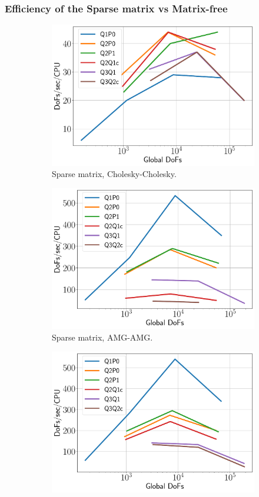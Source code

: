 \documentclass{beamer}
\begin{document}
\begin{frame}
	\frametitle{Efficiency of the Sparse matrix vs Matrix-free}
	\begin{figure}[H]
		\begin{subfigure}{.5\textwidth}
			\centering
			\includegraphics[width=.8\textwidth]{../figs/efficiency-chol-chol.pdf}
			\caption{Sparse matrix, Cholesky-Cholesky.}
		\end{subfigure}%
		\begin{subfigure}{.5\textwidth}
			\centering
			\includegraphics[width=.8\textwidth]{../figs/efficiency-amg-amg.pdf}
			\caption{Sparse matrix, AMG-AMG.}
		\end{subfigure}
		\begin{subfigure}{.5\textwidth}
			\centering
			\includegraphics[width=.8\textwidth]{../figs/efficiency-amg-jac.pdf}

\end{subfigure}
\end{figure}
\end{frame}
\end{document}

